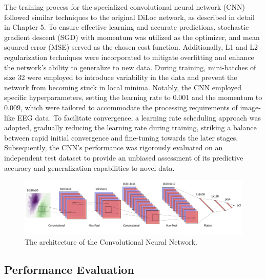 \documentclass[a4paper, UKenglish, 11pt]{uiomaster}
\begin{document}
The training process for the specialized convolutional neural network (CNN) followed similar techniques to the original DiLoc network, as described in detail in Chapter 5. To ensure effective learning and accurate predictions, stochastic gradient descent (SGD) with momentum was utilized as the optimizer, and mean squared error (MSE) served as the chosen cost function. Additionally, L1 and L2 regularization techniques were incorporated to mitigate overfitting and enhance the network's ability to generalize to new data. During training, mini-batches of size 32 were employed to introduce variability in the data and prevent the network from becoming stuck in local minima. Notably, the CNN employed specific hyperparameters, setting the learning rate to 0.001 and the momentum to 0.009, which were tailored to accommodate the processing requirements of image-like EEG data. To facilitate convergence, a learning rate scheduling approach was adopted, gradually reducing the learning rate during training, striking a balance between rapid initial convergence and fine-tuning towards the later stages. Subsequently, the CNN's performance was rigorously evaluated on an independent test dataset to provide an unbiased assessment of its predictive accuracy and generalization capabilities to novel data.

\begin{figure}[!htb]
    \hspace*{-3cm} %
    \centering
    \includegraphics[scale=0.52]{figures/CNN.png}
    \caption{The architecture of the Convolutional Neural Network.}
    \label{fig:architecture_CNN}
\end{figure}


\subsection{Performance Evaluation}
\end{document}
